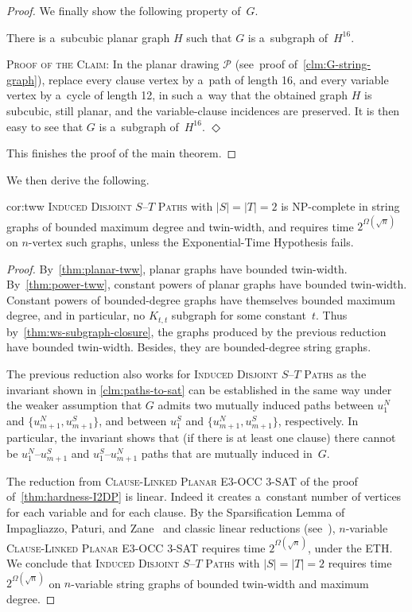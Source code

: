 \documentclass[a4paper,UKenglish,cleveref,autoref]{lipics-v2021}
\newenvironment{proofofclaim}{\noindent \textsc{Proof of the Claim:}}{\unskip\nobreak\hfill$\Diamond$\medskip}
\begin{document}
\begin{proof}
 We finally show the following property of~$G$.
 \begin{claim}\label{clm:bd-tww}
   There is a~subcubic planar graph $H$ such that $G$ is a~subgraph of~$H^{16}$. 
 \end{claim}
 \begin{proofofclaim}
   In the planar drawing $\mathcal P$ (see~proof of~\cref{clm:G-string-graph}), replace every clause vertex by a~path of length 16, and every variable vertex by a~cycle of length 12, in such a~way that the obtained graph $H$ is subcubic, still planar, and the variable-clause incidences are preserved.
   It is then easy to see that $G$ is a~subgraph of~$H^{16}$. 
 \end{proofofclaim}

 This finishes the proof of the main theorem.
\end{proof}

We then derive the following.

\begin{repcorollary}{cor:tww}
  \textsc{Induced Disjoint $S$--$T$ Paths} with $|S|=|T|=2$ is NP-complete in string graphs of bounded maximum degree and twin-width, and requires time $2^{\Omega(\sqrt n)}$ on $n$-vertex such graphs, unless the Exponential-Time Hypothesis fails.
\end{repcorollary}
\begin{proof}
  By~\cref{thm:planar-tww}, planar graphs have bounded twin-width.
  By~\cref{thm:power-tww}, constant powers of planar graphs have bounded twin-width.
  Constant powers of bounded-degree graphs have themselves bounded maximum degree, and in particular, no $K_{t,t}$ subgraph for some constant~$t$.
  Thus by~\cref{thm:ws-subgraph-closure}, the graphs produced by the previous reduction have bounded twin-width.
  Besides, they are bounded-degree string graphs.

  The previous reduction also works for \textsc{Induced Disjoint $S$--$T$ Paths} as the invariant shown in \cref{clm:paths-to-sat} can be established in the same way under the weaker assumption that $G$ admits two mutually induced paths between $u_1^N$ and $\{u^N_{m+1}, u^S_{m+1}\}$, and between $u_1^S$ and $\{u^N_{m+1}, u^S_{m+1}\}$, respectively.
  In particular, the invariant shows that (if there is at least one clause) there cannot be $u_1^N$--$u^S_{m+1}$ and $u_1^S$--$u^N_{m+1}$ paths that are mutually induced in~$G$.  
  
  The reduction from \textsc{Clause-Linked Planar E3-OCC 3-SAT} of the proof of~\cref{thm:hardness-I2DP} is linear.
  Indeed it creates a~constant number of vertices for each variable and for each clause.
  By the Sparsification Lemma of Impagliazzo, Paturi, and Zane~\cite{sparsification} and classic linear reductions (see~\cite{Fellows95,Tippenhauer16}), $n$-variable \textsc{Clause-Linked Planar E3-OCC 3-SAT} requires time $2^{\Omega(\sqrt n)}$, under the ETH.
  We conclude that \textsc{Induced Disjoint $S$--$T$ Paths} with $|S|=|T|=2$ requires time $2^{\Omega(\sqrt n)}$ on $n$-variable string graphs of bounded twin-width and maximum degree.
\end{proof}
\end{document}
